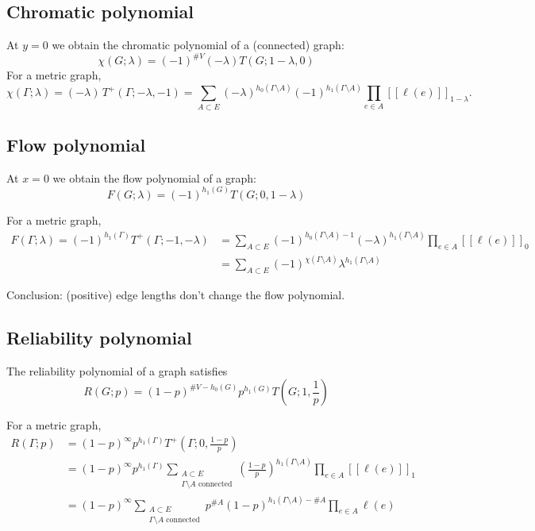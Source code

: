 \documentclass{amsart}
\theoremstyle{definition}
\newcommand{\fanalog}[2]{[\![#2]\!]_{#1}}
\begin{document}
\subsection{Chromatic polynomial}
At $y=0$ we obtain the chromatic polynomial of a (connected) graph:
\begin{equation*}
\chi(G; \lambda) = (-1)^{\#V } (-\lambda) T(G; 1-\lambda,0)
\end{equation*}
For a metric graph,
\begin{equation*}
	\chi(\Gamma; \lambda) = (-\lambda)\, T^+(\Gamma; -\lambda, -1) 
	= \sum_{A \subset E} (-\lambda)^{h_0(\Gamma \setminus A)} (-1)^{h_1(\Gamma \setminus A)} 
	\prod_{e \in A} \fanalog{1 - \lambda}{\ell(e)} .
\end{equation*}

\subsection{Flow polynomial}
At $x = 0$ we obtain the flow polynomial of a graph:
\begin{equation*}
F(G; \lambda) = (-1)^{h_1(G)} T(G; 0, 1 - \lambda)
\end{equation*}

For a metric graph,
\begin{align*}
	F(\Gamma; \lambda) = (-1)^{h_1(\Gamma)} T^+(\Gamma; -1, -\lambda) 
	&= \sum_{A \subset E} (-1)^{h_0(\Gamma \setminus A) - 1} (-\lambda)^{h_1(\Gamma \setminus A)} \prod_{e \in A} \fanalog{0}{\ell(e)} \\
	&= \sum_{A \subset E} (-1)^{\chi(\Gamma \setminus A)} \lambda^{h_1(\Gamma \setminus A)}
\end{align*}

Conclusion: (positive) edge lengths don't change the flow polynomial.

\subsection{Reliability polynomial}
The reliability polynomial of a graph satisfies
\begin{equation*}
R(G; p) = (1 - p)^{\# V - h_0(G)} p^{h_1(G)} T\left(G; 1, \textstyle\frac{1}{p} \right)
\end{equation*}

For a metric graph,
\begin{align*}
R(\Gamma; p) &= (1 - p)^\infty p^{h_1(\Gamma)} T^+\left(\Gamma; 0, \frac{1 - p}{p} \right) \\
&= (1 - p)^\infty p^{h_1(\Gamma)} \sum_{\substack{A \subset E \\ \Gamma \setminus A \text{ connected}}} \left(\frac{1 - p}{p}\right)^{h_1(\Gamma \setminus A)} \prod_{e \in A} \fanalog{1}{\ell(e)} \\
&= (1 - p)^\infty \sum_{\substack{A \subset E \\ \Gamma \setminus A \text{ connected}}} p^{\# A} (1 - p)^{h_1(\Gamma \setminus A) - \# A} \prod_{e \in A} \ell(e) 
\end{align*}
\end{document}

